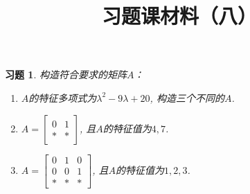 \documentclass{ctexart}
\newtheorem{exercise}[thm]{习题}
\begin{document}
\title{习题课材料（八）}
\author{}
\date{}
\maketitle

\begin{exercise}
构造符合要求的矩阵$A$：
\begin{enumerate}
\item $A$的特征多项式为$\lambda^2-9\lambda+20$, 构造三个不同的$A$. 
\item $A=\begin{bmatrix}0&1\\ *&*\end{bmatrix}$, 且$A$的特征值为$4,7$. 
\item $A=\begin{bmatrix}0&1&0\\0&0&1\\ *&*&*\end{bmatrix}$, 且$A$的特征值为$1,2,3$. 
\end{enumerate}
\end{exercise}
\end{document}
